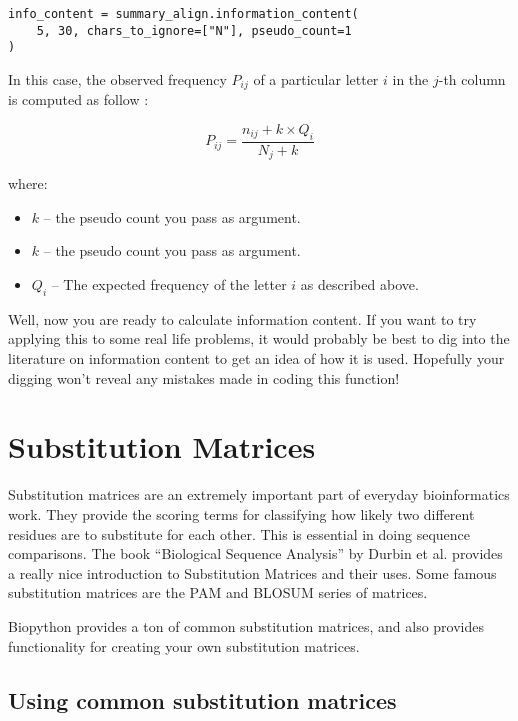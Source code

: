 \begin{verbatim}
info_content = summary_align.information_content(
    5, 30, chars_to_ignore=["N"], pseudo_count=1
)
\end{verbatim}

In this case, the observed frequency $P_{ij}$ of a particular letter $i$ in the $j$-th column is computed as follow :

\begin{displaymath}
P_{ij} = \frac{n_{ij} + k\times Q_{i}}{N_{j} + k}
\end{displaymath}

\noindent where:

\begin{itemize}
  \item $k$ -- the pseudo count you pass as argument.
  \item $k$ -- the pseudo count you pass as argument.
  \item $Q_{i}$ --  The expected frequency of the letter $i$ as described above.
\end{itemize}

Well, now you are ready to calculate information content. If you want to try applying this to some real life problems, it would probably be best to dig into the literature on information content to get an idea of how it is used. Hopefully your digging won't reveal any mistakes made in coding this function!

\section{Substitution Matrices}
\label{sec:sub_matrix}

Substitution matrices are an extremely important part of everyday bioinformatics work. They provide the scoring terms for classifying how likely two different residues are to substitute for each other. This is essential in doing sequence comparisons. The book ``Biological Sequence Analysis'' by Durbin et al. provides a really nice introduction to Substitution Matrices and their uses. Some famous substitution matrices are the PAM and BLOSUM series of matrices.

Biopython provides a ton of common substitution matrices, and also provides functionality for creating your own substitution matrices.

\subsection{Using common substitution matrices}

